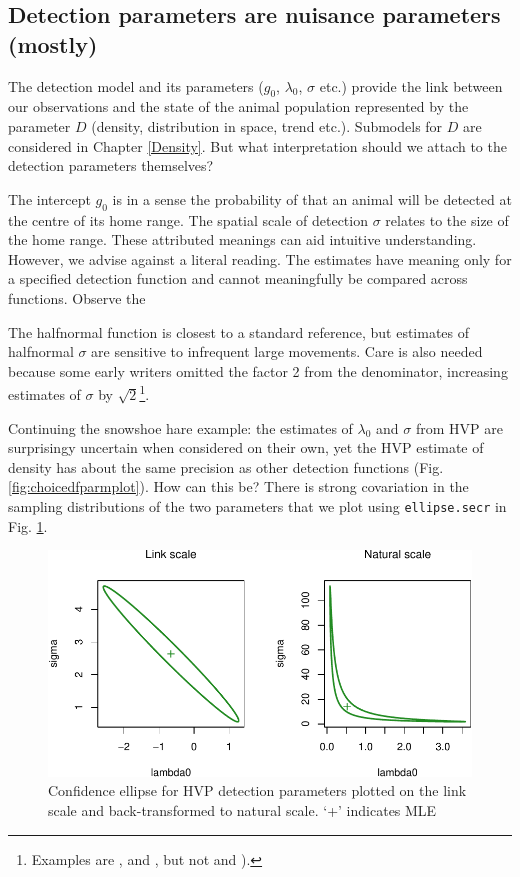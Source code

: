 \documentclass[
]{book}
\begin{document}
\subsection{Detection parameters are nuisance parameters (mostly)}\label{detection-parameters-are-nuisance-parameters-mostly}

The detection model and its parameters (\(g_0\), \(\lambda_0\), \(\sigma\) etc.) provide the link between our observations and the state of the animal population represented by the parameter \(D\) (density, distribution in space, trend etc.). Submodels for \(D\) are considered in Chapter \ref{Density}. But what interpretation should we attach to the detection parameters themselves?

The intercept \(g_0\) is in a sense the probability of that an animal will be detected at the centre of its home range. The spatial scale of detection \(\sigma\) relates to the size of the home range. These attributed meanings can aid intuitive understanding. However, we advise against a literal reading. The estimates have meaning only for a specified detection function and cannot meaningfully be compared across functions. Observe the

The halfnormal function is closest to a standard reference, but estimates of halfnormal \(\sigma\) are sensitive to infrequent large movements. Care is also needed because some early writers omitted the factor 2 from the denominator, increasing estimates of \(\sigma\) by \(\sqrt 2\)\footnote{Examples are \citet{grw09}, \citet{rg11} and \citet{rmgvl11}, but not \citet{rcsg14} and \citet{Royle2015}).}.

Continuing the snowshoe hare example: the estimates of \(\lambda_0\) and \(\sigma\) from HVP are surprisingy uncertain when considered on their own, yet the HVP estimate of density has about the same precision as other detection functions (Fig. \ref{fig:choicedfparmplot}). How can this be? There is strong covariation in the sampling distributions of the two parameters that we plot using \texttt{ellipse.secr} in Fig. \ref{fig:ellipseHVP}.

\begin{figure}
\centering
\includegraphics{SECRbook_files/figure-latex/ellipseHVP-1.pdf}
\caption{\label{fig:ellipseHVP}Confidence ellipse for HVP detection parameters plotted on the link scale and back-transformed to natural scale. `+' indicates MLE}
\end{figure}
\end{document}
